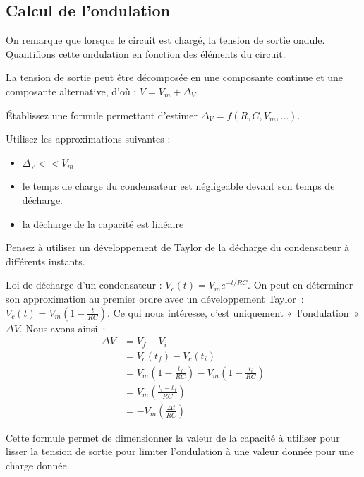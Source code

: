 \documentclass{../template/labo}
\begin{document}
\subsection{Calcul de l'ondulation}
On remarque que lorsque le circuit est chargé, la tension de sortie ondule. Quantifions cette ondulation en fonction des éléments du circuit.

La tension de sortie peut être décomposée en une composante continue et une composante alternative, d'où : $V=V_m+\Delta_V$

\begin{predet}
\Question
{
	Établissez une formule permettant d'estimer $\Delta_V=f(R,C, V_m,\dots)$. %
	
	Utilisez les approximations suivantes :
	\begin{itemize}
	\item $\Delta_V<<V_m$
	\item le temps de charge du condensateur est négligeable devant son temps de décharge.
	\item la décharge de la capacité est linéaire
	\end{itemize}
	\begin{astuce}
		Pensez à utiliser un développement de Taylor de la décharge du condensateur à différents instants.
	\end{astuce}
	\label{Q:form-deltaV}
}
{
Loi de décharge d'un condensateur : $V_c(t) = V_m e^{-t/RC}$. On peut en déterminer son approximation au premier ordre avec un développement Taylor~: $V_c(t) = V_m (1-\frac{t}{RC})$.
Ce qui nous intéresse, c'est uniquement «~l'ondulation~» $\Delta V$.
Nous avons ainsi~: 
\begin{align*}
\Delta V & = V_f - V_i \\
& = V_c(t_f) - V_c(t_i) \\
& = V_m (1-\frac{t_f}{RC}) - V_m (1 - \frac{t_i}{RC})\\
& = V_m (\frac{t_i - t_f}{RC}) \\
& = - V_m (\frac{\Delta t}{RC})
\end{align*}
}%
	\label{Q:14}
\end{predet}

Cette formule permet de dimensionner la valeur de la capacité à utiliser pour lisser la tension de sortie pour limiter l'ondulation à une valeur donnée pour une charge donnée.
\end{document}
